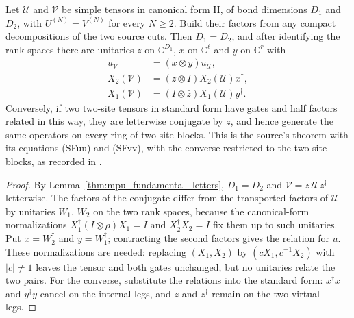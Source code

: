 \begin{lemma}
    \label{thm:mpu_fundamental_half_factors}
    \leanok
    Let $\mathcal U$ and $\mathcal V$ be simple tensors in canonical form II,
    of bond dimensions $D_1$ and $D_2$, with $U^{(N)}=V^{(N)}$ for every
    $N\ge2$. Build their factors from any compact decompositions of the two
    source cuts. Then $D_1=D_2$, and after identifying the rank spaces there
    are unitaries $z$ on $\mathbb C^{D_1}$, $x$ on $\mathbb C^{\ell}$ and $y$
    on $\mathbb C^{r}$ with
    \begin{align}
        u_{\mathcal V}  & =(x\otimes y)u_{\mathcal U},               \\
        X_2(\mathcal V) & =(z\otimes I)X_2(\mathcal U)x^\dagger,     \\
        X_1(\mathcal V) & =(I\otimes\bar z)X_1(\mathcal U)y^\dagger.
    \end{align}
    Conversely, if two two-site tensors in standard form have gates and
    half factors related in this way, they are letterwise conjugate by $z$,
    and hence generate the same operators on every ring of two-site blocks.
    This is the source's theorem with its equations (SFuu) and (SFvv), with
    the converse restricted to the two-site blocks, as recorded in
    \cite{gap:mpu_standard_form_parity_gap}.
\end{lemma}

\begin{proof}\leanok
    By Lemma~\ref{thm:mpu_fundamental_letters}, $D_1=D_2$ and
    $\mathcal V=z\,\mathcal U\,z^\dagger$ letterwise. The factors of the
    conjugate differ from the transported factors of $\mathcal U$ by unitaries
    $W_1$, $W_2$ on the two rank spaces, because the canonical-form
    normalizations $X_1^\dagger(I\otimes\rho)X_1=I$ and $X_2^\dagger X_2=I$
    fix them up to such unitaries. Put $x=W_2^\dagger$ and $y=W_1^\dagger$;
    contracting the second factors gives the relation for $u$. These
    normalizations are needed: replacing $(X_1,X_2)$ by $(cX_1,c^{-1}X_2)$
    with $|c|\ne1$ leaves the tensor and both gates unchanged, but no unitaries
    relate the two pairs. For the converse, substitute the relations into the
    standard form: $x^\dagger x$ and $y^\dagger y$ cancel on the internal legs,
    and $z$ and $z^\dagger$ remain on the two virtual legs.
\end{proof}

